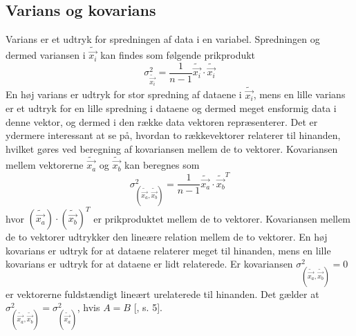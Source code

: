 \subsection{Varians og kovarians}\label{sec:varians}
Varians er et udtryk for spredningen af data i en variabel. Spredningen og dermed variansen i $\tilde{\vec{x_i}}$ kan findes som følgende prikprodukt
\begin{equation}
\sigma^2_{\tilde{\vec{x_i}}}= \frac{1}{n - 1}\tilde{\vec{x_i}} \cdot \tilde{\vec{x_i}}
\label{eq:varians}
\end{equation}
En høj varians er udtryk for stor spredning af dataene i $\tilde{\vec{x_i}}$, mens en lille varians er et udtryk for en lille spredning i dataene og dermed meget ensformig data i denne vektor, og dermed i den række data vektoren repræsenterer.
Det er ydermere interessant at se på, hvordan to rækkevektorer relaterer til hinanden, hvilket gøres ved beregning af kovariansen mellem de to vektorer. Kovariansen mellem vektorerne $\tilde{\vec{x_a}}$ og $\tilde{\vec{x_b}}$ kan beregnes som \begin{equation}
\sigma^2_{(\tilde{\vec{x_a}},\tilde{\vec{x_b}})} = \frac{1}{n - 1} \tilde{\vec{x_a}} \cdot {\tilde{\vec{x_b}}}^T
\label{eq:covarians}
\end{equation}
hvor $(\tilde{\vec{x_a}}) \cdot (\tilde{\vec{x_b}})^T$ er prikproduktet mellem de to vektorer. Kovariansen mellem de to vektorer udtrykker den lineære relation mellem de to vektorer. En høj kovarians er udtryk for at dataene relaterer meget til hinanden, mens en lille kovarians er udtryk for at dataene er lidt relaterede. Er kovariansen $\sigma^2_{(\tilde{\vec{x_a}},\tilde{\vec{x_b}})} = 0$ er vektorerne fuldstændigt lineært urelaterede til hinanden. Det gælder at $\sigma^2_{(\tilde{\vec{x_a}},\tilde{\vec{x_b}})}=\sigma^2_{(\tilde{\vec{x_a}})}$, hvis $A=B$ [\citet{PCA_slens}, s. 5].

